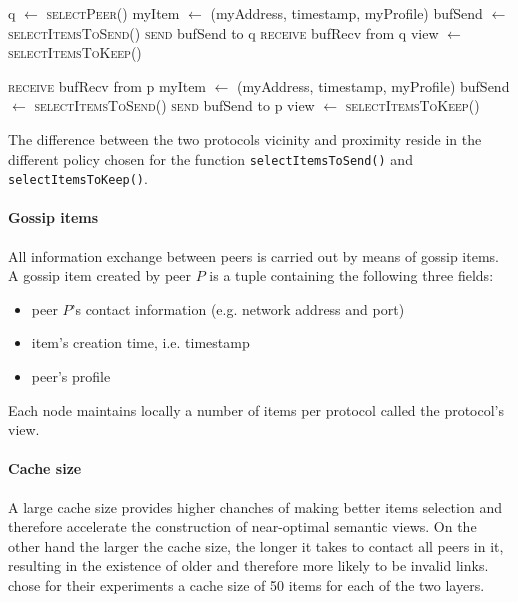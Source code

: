 \begin{algorithm}[t]
\caption{Cyclon and Vicinity epidepic protocols skeleton (cf. \cite{VS05, VSI06})}
\begin{algorithmic}[1]

\State q $\gets$ \textsc{selectPeer}()
\State myItem $\gets$ (myAddress, timestamp, myProfile)
\State bufSend $\gets$ \textsc{selectItemsToSend}()
\State \textsc{send} bufSend to q
\State \textsc{receive} bufRecv from q
\State view $\gets$ \textsc{selectItemsToKeep}()

\EndProcedure

\Statex


\State \textsc{receive} bufRecv from p
\State myItem $\gets$ (myAddress, timestamp, myProfile)
\State bufSend $\gets$ \textsc{selectItemsToSend}()
\State \textsc{send} bufSend to p
\State view $\gets$ \textsc{selectItemsToKeep}()

\EndProcedure

\end{algorithmic}
\end{algorithm}

The difference between the two protocols vicinity and proximity reside in the different policy chosen for the function \texttt{selectItemsToSend()} and \texttt{selectItemsToKeep()}.

\paragraph{Gossip items} All information exchange between peers is carried out by means of gossip items. A gossip item created by peer $P$ is a tuple containing the following three fields:
\begin{itemize}
\item peer $P$'s contact information (e.g. network address and port)
\item item's creation time, i.e. timestamp
\item peer's profile
\end{itemize}
Each node maintains locally a number of items per protocol called the protocol's view.

\paragraph{Cache size} A large cache size provides higher chanches of making better items selection and therefore accelerate the construction of near-optimal semantic views. On the other hand the larger the cache size, the longer it takes to contact all peers in it, resulting in the existence of older and therefore more likely to be invalid links. \cite{VS05, VSI06} chose for their experiments a cache size of 50 items for each of the two layers.

